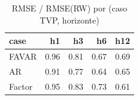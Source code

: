 \begin{table}[ht]
\centering
\begin{tabular}{lrrrr}
  \hline
case & h1 & h3 & h6 & h12 \\ 
  \hline
FAVAR & 0.96 & 0.81 & 0.67 & 0.69 \\ 
  AR & 0.91 & 0.77 & 0.64 & 0.65 \\ 
  Factor & 0.95 & 0.83 & 0.73 & 0.61 \\ 
   \hline
\end{tabular}
\caption{RMSE / RMSE(RW) por (caso TVP, horizonte)} 
\label{tab:tvps_rmse_wide}
\end{table}
